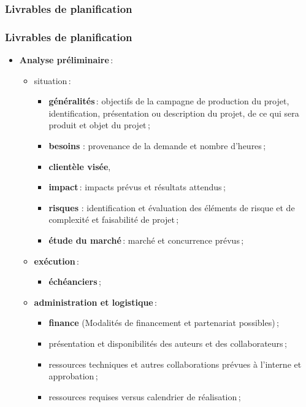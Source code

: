 						\subsubsection{Livrables de planification} 
							\begin{frame}[allowframebreaks]
							\frametitle{Livrables de planification}
                        				\begin{itemize}
							
							\item \textbf{Analyse préliminaire}\,:
								\begin{itemize}
								\item situation\,:
									\begin{itemize}
									\item \textbf{généralités}\,: objectifs de la campagne de production du projet, identification, présentation ou description du projet, de ce qui sera produit et objet du projet\,;
									\item \textbf{besoins }: provenance de la demande et nombre d’heures\,;
									\item \textbf{clientèle visée},
									\item \textbf{impact}\,: impacts prévus et résultats attendus\,;
									\item \textbf{risques }: identification et évaluation des éléments de risque et de complexité et faisabilité de projet\,;										
									\item \textbf{étude du marché}\,: marché et concurrence prévus\,;								
									\end{itemize}
								\framebreak
								\item \textbf{exécution}\,: 
									\begin{itemize}
									\item \textbf{échéanciers}\,;
									\end{itemize}
								\item \textbf{administration et logistique}\,:
									\begin{itemize}
									\item \textbf{finance} (Modalités de financement et partenariat possibles)\,;						
									\item présentation et disponibilités des auteurs et des collaborateurs\,;
									\item ressources techniques et autres collaborations prévues à l’interne et approbation\,;
									\item ressources requises versus calendrier de réalisation\,;
									\end{itemize}
								\end{itemize}
							\framebreak
							

\end{itemize}
\end{frame}
